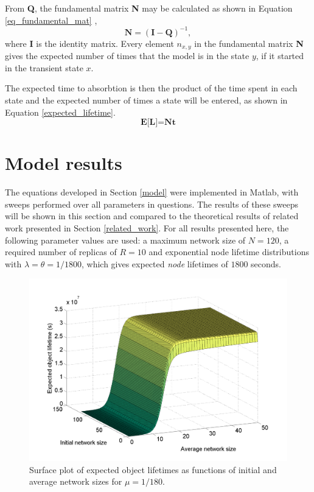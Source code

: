 \documentclass[10pt,a4paper,conference]{IEEEtran}
\begin{document}
From \textbf{Q}, the fundamental matrix \textbf{N} may be calculated as shown in Equation \eqref{eq_fundamental_mat} \cite{grinstead1997introduction_probability},
%
\begin{equation} \label{eq_fundamental_mat}
    \textbf{N} = (\textbf{I} - \textbf{Q})^{-1},
\end{equation}
%
where \textbf{I} is the identity matrix. Every element $n_{x,y}$ in the fundamental matrix \textbf{N} gives the expected number of times that the model is in the state $y$, if it started in the transient state $x$.

The expected time to absorbtion is then the product of the time spent in each state and the expected number of times a state will be entered, as shown in Equation \eqref{expected_lifetime}.
%
\begin{equation} \label{expected_lifetime}
    \textbf{E[L]} = \textbf{Nt}
\end{equation}

\section{Model results}
\label{results}

The equations developed in Section \ref{model} were implemented in Matlab, with sweeps performed over all parameters in questions. The results of these sweeps will be shown in this section and compared to the theoretical results of related work presented in Section \ref{related_work}. For all results presented here, the following parameter values are used: a maximum network size of $N=120$, a required number of replicas of $R = 10$ and exponential node lifetime distributions with $\lambda = \theta = 1/1800$, which gives expected \emph{node} lifetimes of $1800$ seconds.


\begin{figure}[htbp]
 \centering
 \includegraphics[clip=true, viewport=2.0cm 1.0cm 27.5cm 19.15cm, width=\columnwidth]{lifetime_av_init_groupsize}
 \caption{Surface plot of expected object lifetimes as functions of initial and average network sizes for $\mu = 1/180$.}
 \label{fig_lifetime_average_vs_initial_rep}
\end{figure}
\end{document}
